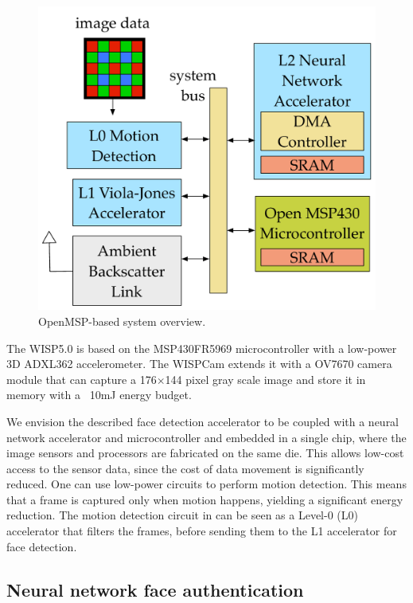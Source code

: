 \begin{figure}
  \includegraphics[width=\textwidth]{nsp-figs/system_overview.pdf}
  \caption{OpenMSP-based system overview. }
  \label{fig:OMSP}
\end{figure}


The WISP5.0 is based on the MSP430FR5969 microcontroller with a low-power 3D ADXL362 accelerometer. The WISPCam extends it with a OV7670 camera module that can capture a 176$\times$144 pixel gray scale image and store it in memory with a ~10mJ energy budget.

We envision the described face detection accelerator to be coupled with a neural network accelerator and microcontroller and embedded in a single chip, where the image sensors and processors are fabricated on the same die. This allows low-cost access to the sensor data, since the cost of data movement is significantly reduced. One can use low-power circuits to perform motion detection. This means that a frame is captured only when motion happens, yielding a significant energy reduction. The motion detection circuit in \cite{multipower-isscc13} can be seen as a Level-0 (L0) accelerator that filters the frames, before sending them to the L1 accelerator for face detection.

\subsection{Neural network face authentication}

